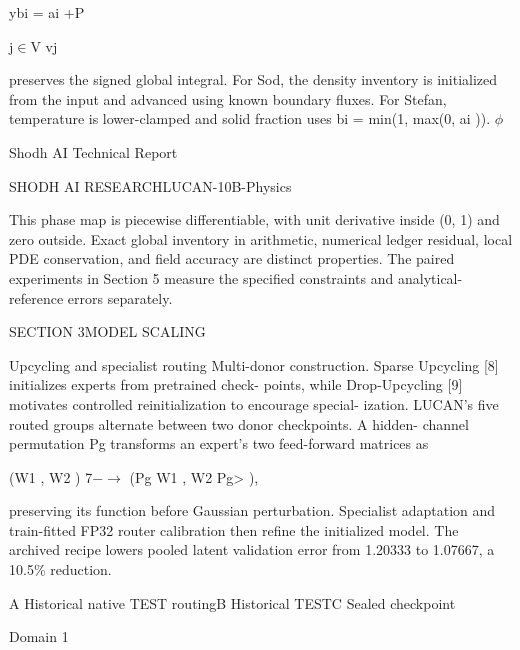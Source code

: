\documentclass[11pt]{article}
\begin{document}
\noindent ybi = ai +\quad P\par

j\ensuremath{\in}V vj

preserves the signed global integral. For Sod, the density inventory is initialized from the
input and advanced using known boundary fluxes. For Stefan, temperature is lower-clamped
and solid fraction uses
bi = min(1, max(0, ai )).
\ensuremath{\phi}



\noindent Shodh AI Technical Report\par




\noindent SHODH AI RESEARCH\quad LUCAN-10B-Physics\par



This phase map is piecewise differentiable, with unit derivative inside (0, 1) and zero outside.
Exact global inventory in arithmetic, numerical ledger residual, local PDE conservation,
and field accuracy are distinct properties. The paired experiments in Section 5 measure the
specified constraints and analytical-reference errors separately.


\noindent SECTION 3\quad MODEL SCALING\par


Upcycling and specialist routing
Multi-donor construction. Sparse Upcycling [8] initializes experts from pretrained check-
points, while Drop-Upcycling [9] motivates controlled reinitialization to encourage special-
ization. LUCAN’s five routed groups alternate between two donor checkpoints. A hidden-
channel permutation Pg transforms an expert’s two feed-forward matrices as

(W1 , W2 ) 7\ensuremath{-}\ensuremath{\to} (Pg W1 , W2 Pg> ),

preserving its function before Gaussian perturbation. Specialist adaptation and train-fitted
FP32 router calibration then refine the initialized model. The archived recipe lowers pooled
latent validation error from 1.20333 to 1.07667, a 10.5\% reduction.

\noindent A Historical native TEST routing\quad B Historical TEST\quad C Sealed checkpoint\par



\noindent Domain 1\par


\par
\end{document}
